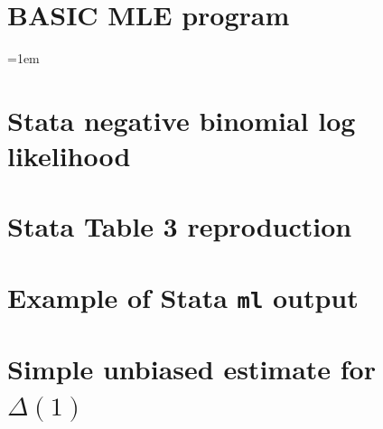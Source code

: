 \documentclass[
  letterpaper, %
  11pt, %
  oneside,  %
  onecolumn,  %
  openany,  %
  article
]{memoir}
\begin{document}
\chapter{BASIC MLE program} %
\label{cha:basic_mle_program}
{\footnotesize\parindent=0pt \obeylines \texttt{}
\parindent=1em

\newpage
\chapter{Stata negative binomial log likelihood} %
\label{cha:stata_negative_binomial_log_likelihood}
{\footnotesize\parindent=0pt \obeylines\obeyspaces \texttt{}

\newpage
\chapter{Stata Table 3 reproduction} %
\label{cha:stata_table_3_reproduction}
{\footnotesize\parindent=0pt \obeylines\obeyspaces \texttt{}

\newpage
\chapter{Example of Stata \texttt{ml} output} %
\label{cha:stata_example}


\newpage
\chapter{Simple unbiased estimate for $\Delta(1)$} %
\label{cha:simple_unbiased_estimate_for_delta_1}
{\footnotesize\parindent=0pt \obeylines\obeyspaces \texttt{}

}}}}
\end{document}
